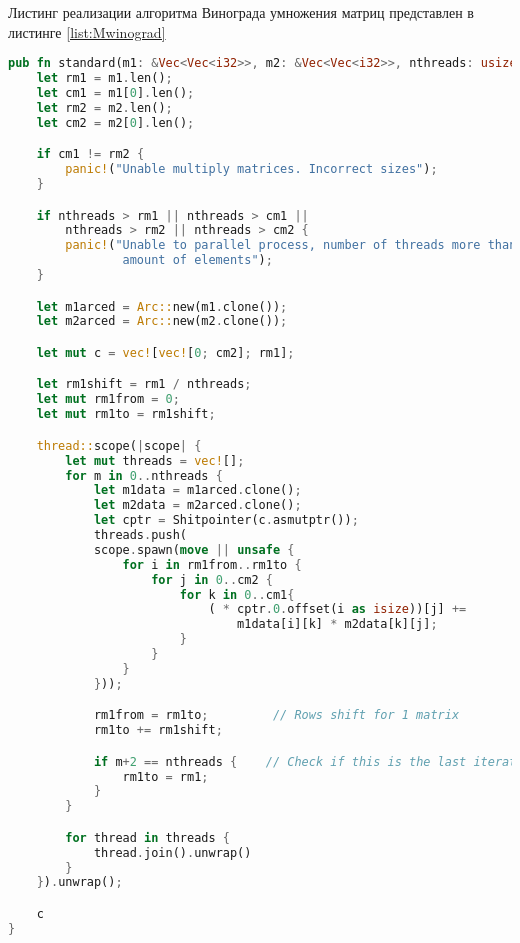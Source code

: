 Листинг реализации алгоритма Винограда умножения матриц представлен в листинге \ref{list:Mwinograd}
\begin{lstlisting}[language=Rust, caption={ Реализация классического алгоритма умножения матриц с  использованием параллелизма},
                    label={list:classicM}]
pub fn standard(m1: &Vec<Vec<i32>>, m2: &Vec<Vec<i32>>, nthreads: usize) -> Vec<Vec<i32>> {
    let rm1 = m1.len();
    let cm1 = m1[0].len();
    let rm2 = m2.len();
    let cm2 = m2[0].len();

    if cm1 != rm2 {
        panic!("Unable multiply matrices. Incorrect sizes");
    }

    if nthreads > rm1 || nthreads > cm1 ||
        nthreads > rm2 || nthreads > cm2 {
        panic!("Unable to parallel process, number of threads more than
                amount of elements");
    }

    let m1arced = Arc::new(m1.clone());
    let m2arced = Arc::new(m2.clone());

    let mut c = vec![vec![0; cm2]; rm1];

    let rm1shift = rm1 / nthreads;
    let mut rm1from = 0;
    let mut rm1to = rm1shift;

    thread::scope(|scope| {
        let mut threads = vec![];
        for m in 0..nthreads {
            let m1data = m1arced.clone();
            let m2data = m2arced.clone();
            let cptr = Shitpointer(c.asmutptr());
            threads.push(
            scope.spawn(move || unsafe {
                for i in rm1from..rm1to {
                    for j in 0..cm2 {
                        for k in 0..cm1{
                            ( * cptr.0.offset(i as isize))[j] +=
                                m1data[i][k] * m2data[k][j];
                        }
                    }
                }
            }));

            rm1from = rm1to;         // Rows shift for 1 matrix
            rm1to += rm1shift;

            if m+2 == nthreads {    // Check if this is the last iteration;
                rm1to = rm1;
            }
        }

        for thread in threads {
            thread.join().unwrap()
        }
    }).unwrap();

    c
}
\end{lstlisting}


